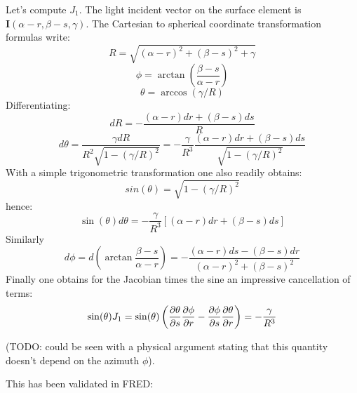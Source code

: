 Let's compute $J_1$.
The light incident vector on the surface element is 
$\mathbf{I}(\alpha-r, \beta-s, \gamma)$.
 The Cartesian to spherical 
coordinate transformation formulas write:
\[ R = \sqrt{(\alpha-r)^2+(\beta-s)^2+\gamma} \]
\[ \phi = \arctan(\frac{\beta-s}{\alpha-r}) \]
\[ \theta = \arccos(\gamma/R) \]
Differentiating:
\[ dR = -\frac{(\alpha-r)dr + (\beta-s)ds}{R} \]
\[ d\theta = \frac{\gamma dR}{R^2 \sqrt{1-(\gamma/R)^2}} 
 = -\frac{\gamma}{R^3} \frac{(\alpha-r)dr + (\beta-s)ds}
{\sqrt{1-(\gamma/R)^2}} \]
With a simple trigonometric transformation one also readily
obtains:
\[ sin(\theta) = \sqrt{1-(\gamma/R)^2} \]
hence:
\[ \sin(\theta) d\theta = 
 -\frac{\gamma}{R^3} \left[ (\alpha-r)dr + (\beta-s)ds \right] \]
Similarly
\[ d\phi = d\left(\arctan\frac{\beta-s}{\alpha-r} \right) 
= - \frac{(\alpha-r)ds - (\beta-s)dr}{(\alpha-r)^2 + (\beta-s)^2}
\]
Finally one obtains for the Jacobian times the sine an 
impressive cancellation of terms:
\[ \sin(\theta) J_1 = \sin(\theta)\left( \frac{\partial{\theta}}{\partial{s}} 
\frac{\partial{\phi}}{\partial{r}} - \frac{\partial{\phi}}{\partial{s}}\frac{\partial{\theta}}{\partial{r}} \right) 
 = -\frac{\gamma}{R^3}\]

(TODO: could be seen with a physical argument stating that
this quantity doesn't depend on the azimuth $\phi$).

This has been validated in FRED:

